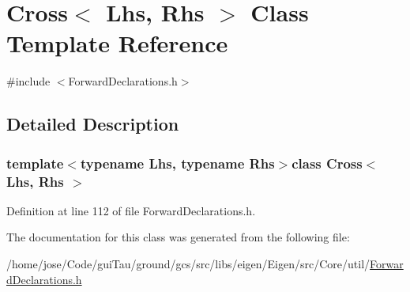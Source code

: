 \hypertarget{class_cross}{\section{Cross$<$ Lhs, Rhs $>$ Class Template Reference}
\label{class_cross}
}


{\ttfamily \#include $<$Forward\-Declarations.\-h$>$}



\subsection{Detailed Description}
\subsubsection*{template$<$typename Lhs, typename Rhs$>$class Cross$<$ Lhs, Rhs $>$}



Definition at line 112 of file Forward\-Declarations.\-h.



The documentation for this class was generated from the following file\-:\begin{DoxyCompactItemize}
\item 
/home/jose/\-Code/gui\-Tau/ground/gcs/src/libs/eigen/\-Eigen/src/\-Core/util/\hyperlink{_forward_declarations_8h}{Forward\-Declarations.\-h}\end{DoxyCompactItemize}
